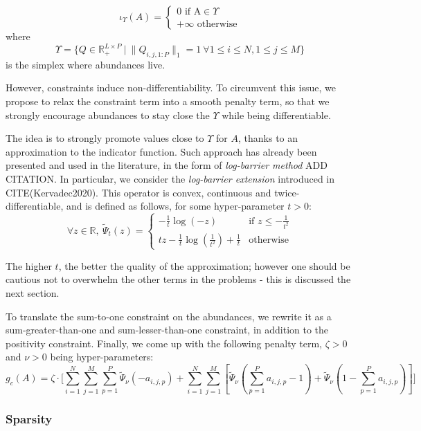 \documentclass{article}
\begin{document}
$$\iota_\Upsilon (A) = \begin{cases} 0 \text{ if A}\in \Upsilon\\ +\infty \text{ otherwise} \end{cases}$$
where
$$\Upsilon = \{Q \in \mathbb{R}^{L \times P}_+\ |\ \| Q_{i, j, 1:P} \|_1 = 1 \ \forall 1 \leq i \leq N, 1 \leq j \leq M\}$$
is the simplex where abundances live.

However, constraints induce non-differentiability. To circumvent this issue, we propose to relax the constraint term into a smooth penalty term, so that we strongly encourage abundances to stay close the $\Upsilon$ while being differentiable.

The idea is to strongly promote values close to $\Upsilon$ for $A$, thanks to an approximation to the indicator function. Such approach has already been presented and used in the literature, in the form of \emph{log-barrier method} ADD CITATION. In particular, we consider the \emph{log-barrier extension} introduced in CITE(Kervadec2020). This operator is convex, continuous and twice-differentiable, and is defined as follows, for some hyper-parameter $t > 0$:
$$\forall z\in \mathbb{R},\ \tilde\Psi_t (z) = \begin{cases} - \frac{1}{t} \log (-z) & \text{if } z \leq -\frac{1}{t^2}\\ tz - \frac{1}{t} \log(\frac{1}{t^2}) + \frac{1}{t} & \text{otherwise} \end{cases}$$

The higher $t$, the better the quality of the approximation; however one should be cautious not to overwhelm the other terms in the problems - this is discussed the next section.

To translate the sum-to-one constraint on the abundances, we rewrite it as a sum-greater-than-one and sum-lesser-than-one constraint, in addition to the positivity constraint. Finally, we come up with the following penalty term, $\zeta > 0$ and $\nu > 0$ being hyper-parameters:
\begin{equation}\label{eq:g_c}
  g_c (A) = \zeta \cdot \Bigg[ \sum_{i = 1}^N \sum_{j = 1}^M \sum_{p=1}^P \tilde\Psi_\nu (-a_{i,j,p}) + \sum_{i = 1}^N \sum_{j = 1}^M \left[ \tilde\Psi_\nu(\sum_{p=1}^P a_{i,j,p} - 1) + \tilde\Psi_\nu(1 - \sum_{p=1}^Pa_{i,j,p}) \right] \Bigg]
\end{equation}

\subsubsection{Sparsity}
\end{document}
